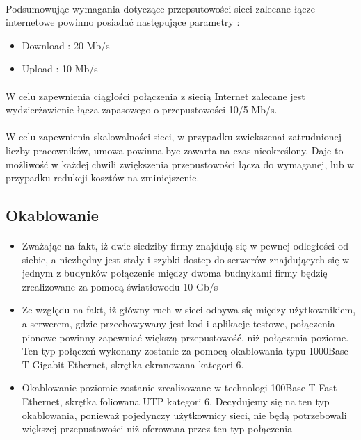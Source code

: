 \paragraph{}
Podsumowując wymagania dotyczące przepsutowości sieci zalecane łącze internetowe powinno posiadać następujące parametry :
\begin{itemize}
	\item Download : 20 Mb/s
	\item Upload : 10 Mb/s
\end{itemize}

\paragraph{}
W celu zapewnienia ciągłości połączenia z siecią Internet zalecane jest wydzierżawienie łącza zapasowego o przepustowości 10/5 Mb/s.

\paragraph{}
W celu zapewnienia skalowalności sieci, w przypadku zwiekszenai zatrudnionej liczby pracowników, umowa powinna byc zawarta na czas nieokreślony. Daje to możliwość w każdej chwili zwiększenia przepustowości łącza do wymaganej, lub w przypadku redukcji kosztów na zminiejszenie.


\subsection{Okablowanie}
\paragraph{}


\begin{itemize}
  \item Zważając na fakt, iż dwie siedziby firmy znajdują się w pewnej odległości od siebie, a niezbędny jest stały i szybki dostep do serwerów znajdujących się w jednym z budynków połączenie między dwoma budnykami firmy będzię zrealizowane za pomocą światłowodu 10 Gb/s

  \item Ze względu na fakt, iż główny ruch w sieci odbywa się między użytkownikiem, a serwerem, gdzie przechowywany jest kod i aplikacje testowe, połączenia pionowe powinny zapewniać większą przepustowość, niż połączenia  poziome. Ten typ połączeń wykonany zostanie za pomocą okablowania typu 1000Base-T Gigabit Ethernet, skrętka ekranowana kategori 6.

  \item Okablowanie poziomie zostanie zrealizowane w technologi 100Base-T Fast Ethernet, skrętka foliowana UTP kategori 6. Decydujemy się na ten typ okablowania, ponieważ pojedynczy użytkownicy sieci, nie będą potrzebowali większej przepustowości niż oferowana przez ten typ połączenia

\end{itemize}